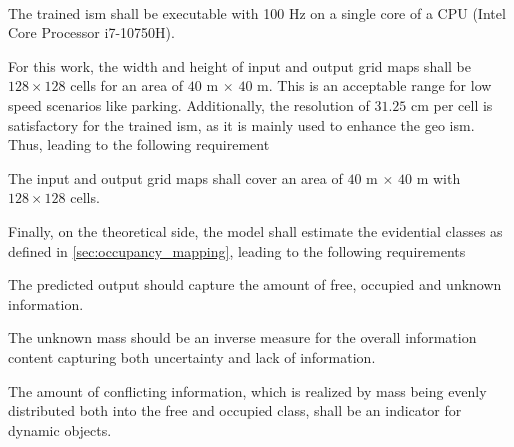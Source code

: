 \\
\begin{subreq} \label{subreq:resource_efficient_inference}
	The trained \gls{ism} shall be executable with 100 Hz on a single core of a CPU (Intel Core Processor i7-10750H).
\end{subreq}
For this work, the width and height of input and output grid maps shall be $128 \times 128$ cells for an area of $40$ m $\times$ $40$ m. This is an acceptable range for low speed scenarios like parking. Additionally, the resolution of $31.25$ cm per cell is satisfactory for the trained \gls{ism}, as it is mainly used to enhance the geo \gls{ism}. Thus, leading to the following requirement
\\
\begin{subreq} \label{subreq:grid_map_size}
	The input and output grid maps shall cover an area of $40$ m $\times$ $40$ m with $128 \times 128$ cells.
\end{subreq}
Finally, on the theoretical side, the model shall estimate the evidential classes as defined in \ref{sec:occupancy_mapping}, leading to the following requirements
\\
\begin{subreq} \label{subreq:ev_rep}
	The predicted output should capture the amount of free, occupied and unknown information.
\end{subreq}
\vspace{\baselineskip}
\begin{subreq} \label{subreq:unknown_mass}
	The unknown mass should be an inverse measure for the overall information content capturing both uncertainty and lack of information.
\end{subreq}
\vspace{\baselineskip}
\begin{subreq} \label{subreq:conflicting_mass}
	The amount of conflicting information, which is realized by mass being evenly distributed both into the free and occupied class, shall be an indicator for dynamic objects.
\end{subreq}

%
